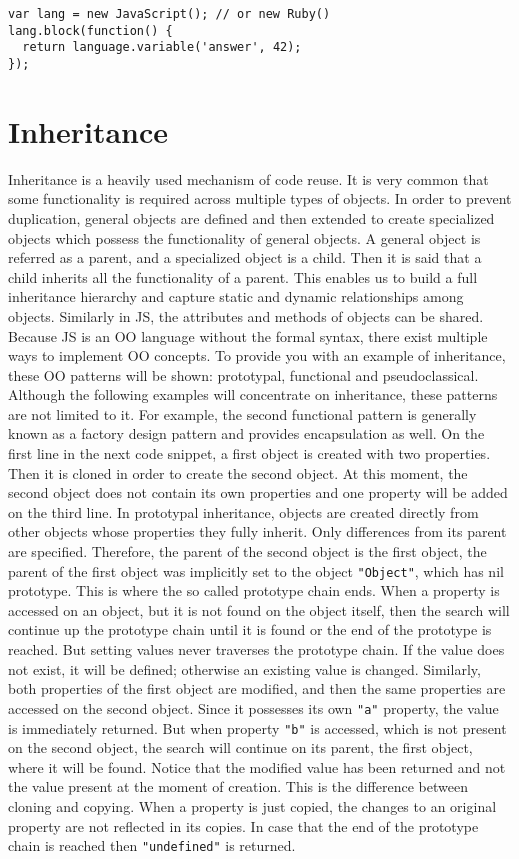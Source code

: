 \documentclass{bioinfo}
\begin{document}
\begin{lstlisting}
var lang = new JavaScript(); // or new Ruby()
lang.block(function() { 
  return language.variable('answer', 42); 
});
\end{lstlisting}


\section{Inheritance}
Inheritance is a heavily used mechanism of code reuse. It is very common that some functionality is required across multiple types of objects. In order to prevent duplication, general objects are defined and then extended to create specialized objects which possess the functionality of general objects. A general object is referred as a parent, and  a specialized object is a child. Then it is said that a child inherits all the functionality of a parent. This enables us to build a full inheritance hierarchy and capture static and dynamic relationships among objects. Similarly in JS, the attributes and methods of objects can be shared. Because JS is an OO language without the formal syntax, there exist multiple ways to implement OO concepts. To provide you with an example of inheritance, these OO patterns will be shown:  prototypal, functional and pseudoclassical. Although the following examples will concentrate on inheritance, these patterns are not limited to it. For example, the second functional pattern is generally known as a factory design pattern and provides encapsulation as well.
On the first line in the next code snippet, a first object is created with two properties. Then it is cloned in order to create the second object. At this moment, the second object does not contain its own properties and one property will be added on the third line.
In prototypal inheritance, objects are created directly from other objects whose properties they fully inherit. Only differences from its parent are specified. Therefore, the parent of the second object is the first object, the parent of the first object was implicitly set to the object \texttt{"Object"}, which has nil prototype. This is where the so called prototype chain ends. When a property is accessed on an object, but it is not found on the object itself, then the search will continue up the prototype chain until it is found or the end of the prototype is reached. But setting values never traverses the prototype chain. If the value does not exist, it will be defined; otherwise an existing value is changed. Similarly, both properties of the first object are modified, and then the same properties are accessed on the second object. Since it possesses its own \texttt{"a"} property, the value is immediately returned. But when property \texttt{"b"} is accessed, which is not present on the second object, the search will continue on its parent, the first object, where it will be found. Notice that the modified value has been returned and not the value present at the moment of creation. This is the difference between cloning and copying. When a property is just copied, the changes to an original property are not reflected in its copies. In case that the end of the prototype chain is reached then \texttt{"undefined"} is returned.
\end{document}
